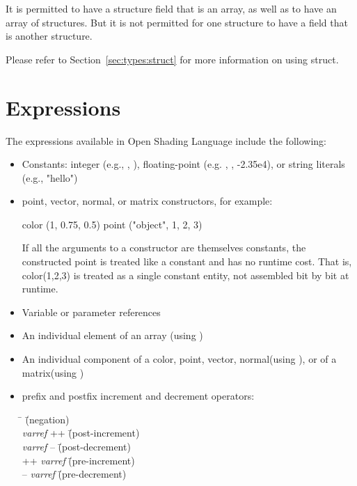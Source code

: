 \documentclass[11pt,letterpaper]{book}
\def\langname{Open Shading Language\xspace}
\def\color{{\cf color}\xspace}
\def\matrix{{\cf matrix}\xspace}
\def\normal{{\cf normal}\xspace}
\def\point{{\cf point}\xspace}
\def\vector{{\cf vector}\xspace}
\begin{document}
It is permitted to have a structure field that is an array, as well as
to have an array of structures.  But it is not permitted for one
structure to have a field that is another structure.

Please refer to Section~\ref{sec:types:struct} for more information
on using {\cf struct}.


\section{Expressions}
\label{sec:expressions}

The expressions available in \langname include the following:

\begin{itemize}
\item Constants: integer (e.g., {}, {}), floating-point
  (e.g. {}, {}, {\cf -2.35e4}), or string literals (e.g., {\cf
  "hello"})

\item point, vector, normal, or matrix constructors, for example:

\begin{code}
    color (1, 0.75, 0.5)
    point ("object", 1, 2, 3)
\end{code}

If all the arguments to a constructor are themselves constants, the
constructed point is treated like a constant and has no runtime cost.
That is, {\cf color(1,2,3)} is treated as a single constant entity, not
assembled bit by bit at runtime.

\item Variable or parameter references

\item An individual element of an array (using {\cf [ ] })

\item An individual component of a \color,
\point, \vector, \normal (using {\cf [ ]}), 
or of a \matrix (using {\cf [][]})

\item prefix and postfix increment and decrement operators:

\begin{tabbing}
\hspace{.25in} \= \hspace{2in} \= (negation) \kill \\
\> \emph{varref} {\cf ++} \hspace{1in} \= (post-increment) \\
\> \emph{varref} {\cf --}  \hspace{1in} \= (post-decrement) \\
\> {\cf ++} \emph{varref} \hspace{1in} \= (pre-increment) \\
\> {\cf --} \emph{varref} \hspace{1in} \= (pre-decrement) \\
\end{tabbing}


\end{itemize}
\end{document}
